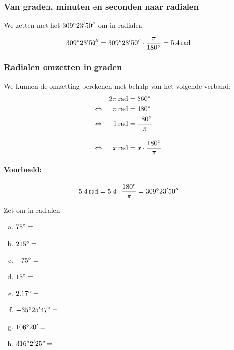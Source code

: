 \documentclass[a4paper,12pt,twoside ]{article}
\begin{document}
\subsubsection{Van graden, minuten en seconden naar radialen}

We zetten met het  $309^\circ 23' 50''$ om in radialen:

$$309\degree 23' 50''=309\degree 23' 50''\cdot \dfrac{\pi}{180\degree}=5.4\rad$$

\subsubsection{Radialen omzetten in graden}
We kunnen de omzetting berekenen met behulp van het volgende verband:
\begin{alignat*}{2}
     &&2\pi\rad &=360\degree\\
\LRA &&\pi \rad &=180\degree\\
\LRA &&  1 \rad &= \frac{180\degree}{\pi}\\[1em]
\LRA &&  x \rad &= x\cdot\frac{180\degree}{\pi}
\end{alignat*}

\paragraph{Voorbeeld:}
$$5.4 \rad=5.4\cdot\dfrac{180\degree}{\pi}=309\degree 23' 50''$$

\begin{oefening} Zet om in radialen
\begin{multicols}{2}
\begin{enumerate}[(a)]
  \itemsep1em
  \item $75^\circ=$\arulefill
  \item $215^\circ=$\arulefill
  \item $-75^\circ=$\arulefill
  \item $15^\circ=$\arulefill
  \item $2.17^\circ=$\arulefill
  \item $-35^\circ25'47"=$\arulefill
  \item $106^\circ20'=$\arulefill
  \item $316^\circ2'25"=$\arulefill
\end{enumerate}
\end{multicols}
\end{oefening}
\end{document}
